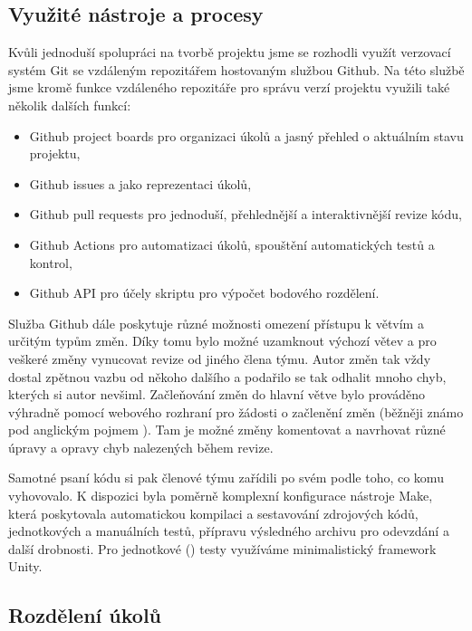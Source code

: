 \documentclass[11pt,a4paper]{article}
\begin{document}
\subsection{Využité nástroje a procesy}

Kvůli jednoduší spolupráci na tvorbě projektu jsme se rozhodli využít verzovací systém Git se vzdáleným repozitářem hostovaným službou Github. Na této službě jsme kromě funkce vzdáleného repozitáře pro správu verzí projektu využili také několik dalších funkcí:
\begin{itemize}
    \item Github project boards\cite{gh-proj-boards} pro organizaci úkolů a jasný přehled o aktuálním stavu projektu,
    \item Github issues\cite{gh-issues} a jako reprezentaci úkolů,
    \item Github pull requests\cite{gh-pull-requests} pro jednoduší, přehlednější a interaktivnější revize kódu,
    \item Github Actions\cite{gh-actions} pro automatizaci úkolů, spouštění automatických testů a kontrol,
    \item Github API\cite{gh-api} pro účely skriptu pro výpočet bodového rozdělení.
\end{itemize}

Služba Github dále poskytuje různé možnosti omezení přístupu k větvím a určitým typům změn\cite{gh-protected-branches}. Díky tomu bylo možné uzamknout výchozí větev a pro veškeré změny vynucovat revize od jiného člena týmu. Autor změn tak vždy dostal zpětnou vazbu od někoho dalšího a podařilo se tak odhalit mnoho chyb, kterých si autor nevšiml. Začleňování změn do hlavní větve bylo prováděno výhradně pomocí webového rozhraní pro žádosti o začlenění změn (běžněji známo pod anglickým pojmem ). Tam je možné změny komentovat a navrhovat různé úpravy a opravy chyb nalezených během revize.

Samotné psaní kódu si pak členové týmu zařídili po svém podle toho, co komu vyhovovalo. K dispozici byla poměrně komplexní konfigurace nástroje Make\cite{make-official-docs}\cite{make-cheatsheet}, která poskytovala automatickou kompilaci a sestavování zdrojových kódů, jednotkových a manuálních testů, přípravu výsledného archivu pro odevzdání a další drobnosti. Pro jednotkové () testy využíváme minimalistický framework Unity\cite{unity}.

\subsection{Rozdělení úkolů}
\label{sec:tasks-division}
\end{document}
